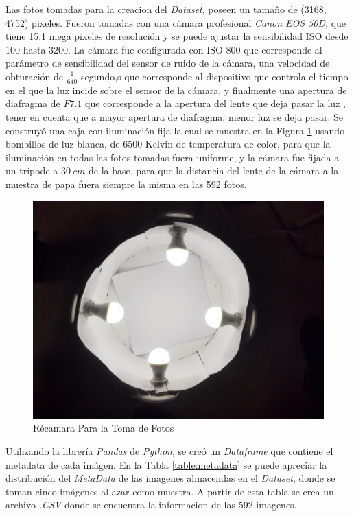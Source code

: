 	Las fotos tomadas para la creacion del \textit{Dataset}, poseen un tamaño de (3168, 4752) pixeles. Fueron tomadas con una cámara profesional \textit{Canon EOS 50D}, que tiene 15.1 mega pixeles de resolución y se puede ajustar la sensibilidad ISO desde 100 hasta 3200. La cámara fue configurada con ISO-800 que corresponde al parámetro de sensibilidad del sensor de ruido de la cámara, una velocidad de obturación de $\frac{1}{640}$ segundo,s que corresponde al dispositivo que controla el tiempo en el que la luz incide sobre el sensor de la cámara, y finalmente una apertura de diafragma de $F 7.1$ que corresponde a la apertura del lente que deja pasar la luz \cite{Camara}, tener en cuenta que a mayor apertura de diafragma, menor luz se deja pasar. Se construyó una caja con iluminación fija la cual se muestra en la Figura \ref{fig:chamber} usando bombillos de luz blanca, de $6500$ Kelvin de temperatura de color, para que la iluminación en todas las fotos tomadas fuera uniforme, y la cámara fue fijada a un trípode a $30 \ cm$ de la base, para que la distancia del lente de la cámara a la muestra de papa fuera siempre la misma en las 592 fotos.

	\begin{figure}[ht]
		\centering
		\includegraphics[scale=0.15]{Figs/Chamber.JPEG}
		\caption{Récamara Para la Toma de Fotos}
		\label{fig:chamber}
	\end{figure}
	
	Utilizando la librería \textit{Pandas} de \textit{Python}, se creó un \textit{Dataframe} que contiene el metadata de cada imágen. En la Tabla \ref{table:metadata} se puede apreciar la distribución del \textit{MetaData} de las imagenes almacendas en el \textit{Dataset}, donde se toman cinco imágenes al azar como muestra. A partir de esta tabla se crea un archivo \textit{.CSV} donde se encuentra la informacion de las 592 imagenes.
	
